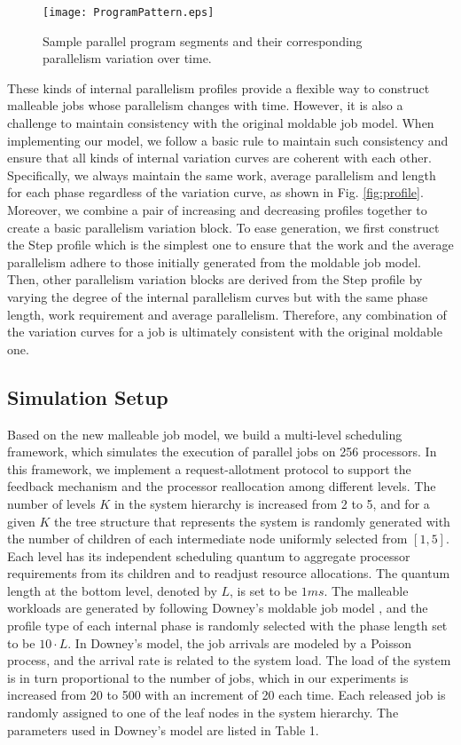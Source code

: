 \documentclass[10pt, a4paper]{article}
\begin{document}
\begin{figure}[t]
\centering
    \texttt{[image: ProgramPattern.eps]}
    \caption{Sample parallel program segments and their corresponding parallelism variation over time.}
    \label{fig:pattern}
\end{figure}

These kinds of internal parallelism profiles provide a flexible way to construct malleable jobs
whose parallelism changes with time. However, it is also a challenge to maintain consistency with
the original moldable job model. When implementing our model, we follow a basic rule to maintain
such consistency and ensure that all kinds of internal variation curves are coherent with each
other. Specifically, we always maintain the same work, average parallelism and length for each
phase regardless of the variation curve, as shown in Fig. \ref{fig:profile}. Moreover, we combine a
pair of increasing and decreasing profiles together to create a basic parallelism variation block.
To ease generation, we first construct the Step profile which is the simplest one to ensure that
the work and the average parallelism adhere to those initially generated from the moldable job
model. Then, other parallelism variation blocks are derived from the Step profile by varying the
degree of the internal parallelism curves but with the same phase length, work requirement and
average parallelism. Therefore, any combination of the variation curves for a job is ultimately
consistent with the original moldable one.

\subsection{Simulation Setup}

Based on the new malleable job model, we build a multi-level scheduling framework, which simulates
the execution of parallel jobs on 256 processors. In this framework, we implement a
request-allotment protocol to support the feedback mechanism and the processor reallocation among
different levels. The number of levels $K$ in the system hierarchy is increased from 2 to 5, and
for a given $K$ the tree structure that represents the system is randomly generated with the number
of children of each intermediate node uniformly selected from $[1,5]$. Each level has its
independent scheduling quantum to aggregate processor requirements from its children and to
readjust resource allocations. The quantum length at the bottom level, denoted by $L$, is set to be
$1ms$. The malleable workloads are generated by following Downey's moldable job model
\cite{Downey98}, and the profile type of each internal phase is randomly selected with the phase
length set to be $10\cdot L$. In Downey's model, the job arrivals are modeled by a Poisson process,
and the arrival rate is related to the system load. The load of the system is in turn proportional
to the number of jobs, which in our experiments is increased from 20 to 500 with an increment of 20
each time. Each released job is randomly assigned to one of the leaf nodes in the system hierarchy.
The parameters used in Downey's model are listed in Table 1.
\end{document}
